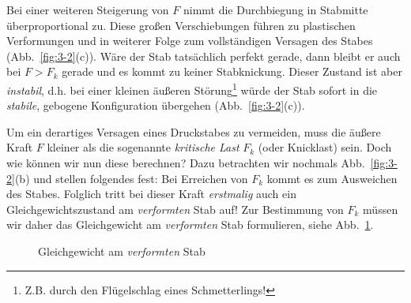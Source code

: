 Bei einer weiteren Steigerung von $F$ nimmt die Durchbiegung in Stabmitte überproportional zu.
Diese großen Verschiebungen führen zu plastischen Verformungen und in weiterer Folge zum vollständigen Versagen des Stabes (Abb.~\ref{fig:3-2}(c)).
Wäre der Stab tatsächlich perfekt gerade, dann bleibt er auch bei $F>F_k$ gerade und es kommt zu keiner Stabknickung.
Dieser Zustand ist aber \emph{instabil}, d.h. bei einer kleinen äußeren Störung\footnote{Z.B. durch den Flügelschlag eines Schmetterlings!} würde der Stab sofort in die \emph{stabile}, gebogene Konfiguration übergehen (Abb.~\ref{fig:3-2}(c)).

Um ein derartiges Versagen eines Druckstabes zu vermeiden, muss die äußere Kraft $F$ kleiner als die sogenannte \emph{kritische Last} $F_k$ (oder Knicklast) sein.
Doch wie können wir nun diese berechnen? Dazu betrachten wir nochmals Abb.~\ref{fig:3-2}(b) und stellen folgendes fest: Bei Erreichen von $F_k$ kommt es zum Ausweichen des Stabes.
Folglich tritt bei dieser Kraft \emph{erstmalig} auch ein Gleichgewichtszustand am \emph{verformten} Stab auf!
Zur Bestimmung von $F_k$ müssen wir daher das Gleichgewicht am \emph{verformten} Stab formulieren, siehe Abb.~\ref{fig:3-3}. 
%
\begin{figure}[h!]
	\centering
	
	\caption{Gleichgewicht am \emph{verformten} Stab}
	\label{fig:3-3}
\end{figure}
%

